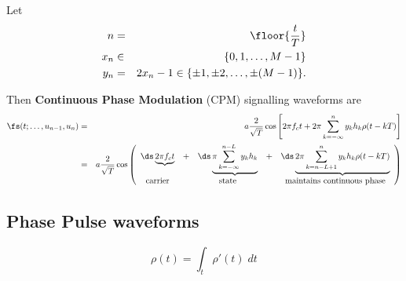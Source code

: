 \begin{definition}
\label{def:CPM}
Let 
\begin{eqnarray*}
   n   & = & \floor{\frac{t}{T}} \\
   x_n &\in& \{0,1,\ldots, M-1 \} \\
   y_n & = & 2x_n -1 \in \{ \pm1, \pm2,\ldots, \pm(M-1)\}.
\end{eqnarray*}

Then
{\bf Continuous Phase Modulation} (CPM) signalling waveforms are
\begin{eqnarray*}
   \fs(t;\ldots,u_{n-1},u_n)
     &=& a \frac{2}{\sqrt{T}} 
           \cos\left[ 
              2\pi f_ct + 
              2\pi\sum_{k=-\infty}^n y_k h_k \rho(t-kT)
           \right]
   \\&=& a \frac{2}{\sqrt{T}} 
           \cos\left( \begin{array}{ccccc}
              \ds \underbrace{2\pi f_ct} &+&
              \ds \underbrace{\pi \sum_{k=-\infty}^{n-L} y_k h_k}  &+&
              \ds \underbrace{2\pi \sum_{k=n-L+1}^n y_k h_k \rho(t-kT)}
              \\
              \mbox{carrier} && \mbox{state} && \mbox{maintains continuous phase}
           \end{array}
           \right)
\end{eqnarray*}
\end{definition}


\subsection{Phase Pulse waveforms}
\[   \rho(t) = \int_t \rho'(t) \; dt \]

